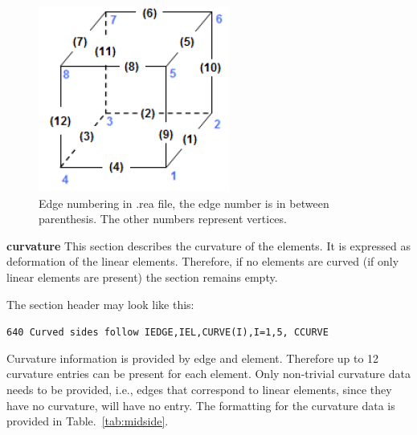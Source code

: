 \begin{description}
\begin{figure}
\begin{center}
\includegraphics[scale=0.5]{Figs/3dcube.png}
\caption{Edge numbering in .rea file, the edge number is in between parenthesis. The other numbers represent vertices.}
\label{fig:edges}
\end{center}
\end{figure}


%


\item{\bf curvature} 
     This section describes the curvature of the elements. It is expressed as deformation of the linear elements.  
     Therefore, if no elements are curved (if only linear elements are present) the section remains empty.

     The section header may look like this:

     \begin{center}
     \texttt{640 Curved sides follow IEDGE,IEL,CURVE(I),I=1,5, CCURVE}
     \end{center}

     Curvature information is provided by edge and element. Therefore up to 12 curvature entries can be present for each element.
Only non-trivial curvature data needs to be provided, i.e., edges that correspond to linear elements, since they have no curvature, will have no entry.
The formatting for the curvature data is provided in Table.~\ref{tab:midside}. 


\end{description}
